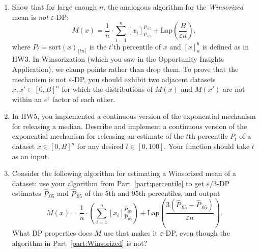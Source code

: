 \documentclass[11pt]{article}
\theoremstyle{plain}
\theoremstyle{definition}
\theoremstyle{solution}
\newcommand{\sort}{\mathrm{sort}}
\begin{document}
\begin{enumerate}[leftmargin=*]
\begin{enumerate}
\item Show that for large enough $n$, the analogous algorithm for the {\em Winsorized} mean is {\em not} $\varepsilon$-DP:
$$M(x) = \frac{1}{n}\cdot \sum_{i=1}^n \left[x_i\right]_{P_{.05}}^{P_{.95}} +\mathrm{Lap}\left(\frac{B}{\varepsilon n}\right),$$
where $P_t = \sort(x)_{\lfloor tn\rceil}$ is the $t$'th percentile of $x$ and $[x]_a^b$ is defined as in HW3.
In Winsorization (which you saw in the Opportunity Insights Application), we clamp points rather than drop them. 
To prove that the mechanism is not $\varepsilon$-DP, you should exhibit two adjacent datasets $x,x'\in [0,B]^n$ for
which the distributions of $M(x)$ and $M(x')$ are not within an $e^{\epsilon}$ factor of each other. \label{part:Winsorized}

\item In HW5, you implemented a continuous version of the exponential mechanism for releasing a median.  Describe and implement a continuous version of the exponential mechanism for releasing an estimate
of the $t$th percentile $P_t$ of a dataset $x\in [0,B]^n$
for any desired $t\in [0,100]$. Your function should take $t$ as an input. \label{part:percentile} 


\iffalse
\item Implement the following $\varepsilon$-DP algorithm for estimating a Trimmed mean of a dataset: use your algorithm from Part~\ref{part:percentile} to get  $\varepsilon/3$-DP estimates
$\hat{P}_{.05}$ and $\hat{P}_{.95}$ of the 5th and 95th percentiles, drop all datapoints that lie outside the range $[\hat{P}_{.05},\hat{P}_{.95}]$, and then use the Laplace mechanism to compute an $(\varepsilon/3)$-DP mean of the trimmed data.  That is, your code should compute 
$$M(x) = \frac{1}{.9n}\cdot \left(\sum_{i : \hat{P}_{.05}\leq x_i \leq \hat{P}_{.95}} x_i\right)
+ \mathrm{Lap}\left(\frac{3(\hat{P}_{.95}-\hat{P}_{.05})}{0.9\varepsilon n}\right).$$
\label{part:ExpTrimLap}
\fi

\item Consider the following algorithm for estimating a Winsorized mean of a dataset: 
use your algorithm from Part~\ref{part:percentile} to get  $\varepsilon/3$-DP estimates
$\hat{P}_{.05}$ and $\hat{P}_{.95}$ of the 5th and 95th percentiles,
and output
$$M(x) = \frac{1}{n}\cdot \left(\sum_{i=1}^n \left[x_i\right]_{\hat{P}_{.05}}^{\hat{P}_{.95}}\right)
+ \mathrm{Lap}\left(\frac{3(\hat{P}_{.95}-\hat{P}_{.05})}{\varepsilon n}\right).$$
What DP properties does $M$ use that makes it $\varepsilon$-DP, even though the algorithm in Part~\ref{part:Winsorized} is not?
\label{part:ExpWinsorized}


\end{enumerate}
\end{enumerate}
\end{document}
